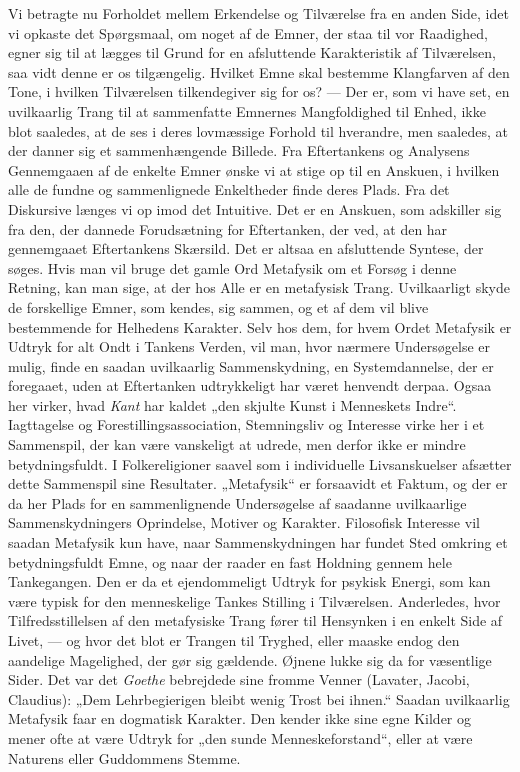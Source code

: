 \documentclass[12pt,a4paper]{book}
\newcommand{\opage}[1]{\marginnote{\footnotesize\textit{[#1]}}}
\begin{document}
Vi betragte nu Forholdet mellem Erkendelse og Tilværelse fra en anden Side, idet vi
opkaste det Spørgsmaal, om noget af de Emner, der staa til vor Raadighed, egner sig
til at lægges til Grund for en afsluttende Karakteristik af Tilværelsen, saa vidt
denne er os tilgængelig. Hvilket Emne skal bestemme Klangfarven af den Tone, i hvilken
Tilværelsen tilkendegiver sig for os? --- Der er, som vi have set, en uvilkaarlig
Trang til at sammenfatte Emnernes Mangfoldighed til Enhed, ikke blot saaledes, at de
ses i deres lovmæssige Forhold til hverandre, men saaledes, at der danner sig et
sammenhængende Billede. Fra Eftertankens og Analysens Gennemgaaen af de enkelte Emner
ønske vi at stige op til en Anskuen, i hvilken alle de fundne og sammenlignede
Enkeltheder finde deres Plads. Fra det Diskursive længes vi op imod det Intuitive. Det
er en Anskuen, som adskiller sig fra den, der dannede Forudsætning for Eftertanken,
der%
\opage{307}ved, at den har gennemgaaet Eftertankens Skærsild. Det er altsaa en afsluttende
Syntese, der søges. Hvis man vil bruge det gamle Ord Metafysik om et Forsøg i denne
Retning, kan man sige, at der hos Alle er en metafysisk Trang. Uvilkaarligt skyde de
forskellige Emner, som kendes, sig sammen, og et af dem vil blive bestemmende for
Helhedens Karakter. Selv hos dem, for hvem Ordet Metafysik er Udtryk for alt Ondt i
Tankens Verden, vil man, hvor nærmere Undersøgelse er mulig, finde en saadan
uvilkaarlig Sammenskydning, en Systemdannelse, der er foregaaet, uden at Eftertanken
udtrykkeligt har været henvendt derpaa. Ogsaa her virker, hvad \emph{Kant} har kaldet
„den skjulte Kunst i Menneskets Indre“. Iagttagelse og Forestillingsassociation,
Stemningsliv og Interesse virke her i et Sammenspil, der kan være vanskeligt at
udrede, men derfor ikke er mindre betydningsfuldt. I Folkereligioner saavel som i
individuelle Livsanskuelser afsætter dette Sammenspil sine Resultater. „Metafysik“ er
forsaavidt et Faktum, og der er da her Plads for en sammenlignende Undersøgelse af
saadanne uvilkaarlige Sammenskydningers Oprindelse, Motiver og Karakter. Filosofisk
Interesse vil saadan Metafysik kun have, naar Sammenskydningen har fundet Sted omkring
et betydningsfuldt Emne, og naar der raader en fast Holdning gennem hele Tankegangen.
Den er da et ejendommeligt Udtryk for psykisk Energi, som kan være typisk for den
menneskelige Tankes Stilling i Tilværelsen. Anderledes, hvor Tilfredsstillelsen af den metafysiske Trang fører til Hensynken i en enkelt Side af Livet, --- og hvor det blot
er Trangen til Tryghed, eller maaske endog den aandelige Magelighed, der gør sig
gældende. Øjnene lukke sig da for væsentlige Sider. Det var det \emph{Goethe} bebrejdede sine fromme Venner (Lavater, Jacobi, Claudius): „Dem Lehrbegierigen bleibt
wenig Trost bei ihnen.“ Saadan uvilkaarlig Metafysik faar en dogmatisk Karakter. Den
kender ikke sine egne Kilder og mener ofte at være Udtryk for „den sunde
Menneskeforstand“, eller at være Naturens eller Guddommens Stemme.
\end{document}

